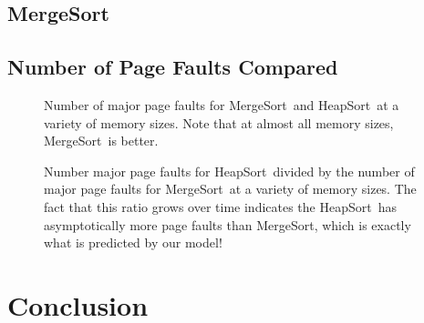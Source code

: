 \documentclass[11pt]{article}
\newcommand{\heapsort}{{\sc HeapSort}}
\newcommand{\mergesort}{{\sc MergeSort}}
\begin{document}
\subsection{\mergesort}

\subsection{Number of Page Faults Compared}

\begin{figure}

\caption{Number of major page faults for \mergesort\ and \heapsort\ at a variety of memory sizes.  Note that at almost all memory sizes, \mergesort\ is better.}
\end{figure}

\begin{figure}

\caption{Number major page faults for \heapsort\ divided by the number of major page faults for \mergesort\ at a variety of memory sizes.  The fact that this ratio grows over time indicates the \heapsort\ has asymptotically more page faults than \mergesort, which is exactly what is predicted by our model!}
\end{figure}

\section{Conclusion}



\end{document}
